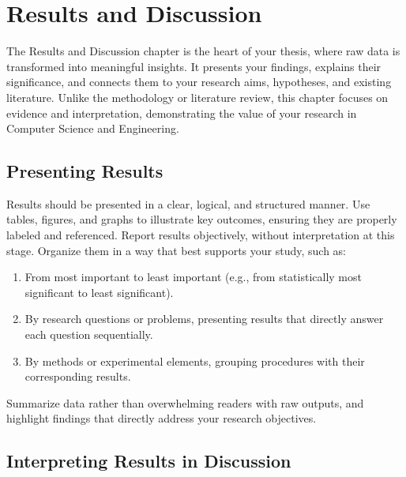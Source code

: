 %

\chapter{Results and Discussion}
\label{ch:results}

The Results and Discussion chapter is the heart of your thesis, where raw data is transformed into meaningful insights. It presents your findings, explains their significance, and connects them to your research aims, hypotheses, and existing literature. Unlike the methodology or literature review, this chapter focuses on evidence and interpretation, demonstrating the value of your research in Computer Science and Engineering.

\section{Presenting Results}
\label{sec:presenting-results}

Results should be presented in a clear, logical, and structured manner. Use tables, figures, and graphs to illustrate key outcomes, ensuring they are properly labeled and referenced. Report results objectively, without interpretation at this stage. Organize them in a way that best supports your study, such as:

\begin{enumerate}
  \item From most important to least important (e.g., from statistically most significant to least significant).
  \item By research questions or problems, presenting results that directly answer each question sequentially.
  \item By methods or experimental elements, grouping procedures with their corresponding results.
\end{enumerate}

Summarize data rather than overwhelming readers with raw outputs, and highlight findings that directly address your research objectives.

\section{Interpreting Results in Discussion}
\label{sec:interpreting-results}

